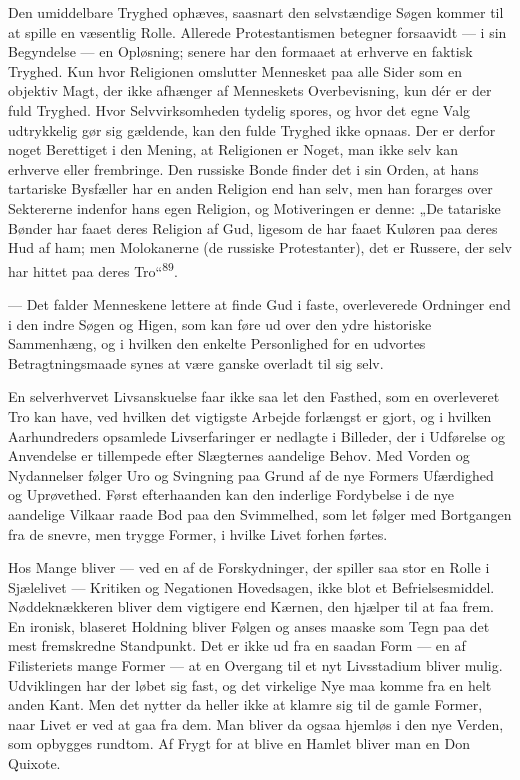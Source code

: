 \documentclass[12pt,a4paper,openany]{book}
\newcommand{\opage}[1]{\marginnote{\footnotesize\textit{[#1]}}}
\begin{document}
Den umiddelbare Tryghed ophæves, saasnart den selvstændige Søgen kommer
til at spille en væsentlig Rolle. Allerede Protestantismen betegner
forsaavidt --- i sin Begyndelse --- en Opløsning; senere har den
formaaet at erhverve en faktisk Tryghed. Kun hvor Religionen omslutter
Mennesket paa alle Sider som en objektiv Magt, der ikke afhænger af
Menneskets Overbevisning, kun dér er der fuld Tryghed. Hvor
Selvvirksomheden tydelig spores, og hvor det egne Valg udtrykkelig gør
sig gældende, kan den fulde Tryghed ikke opnaas. Der er derfor noget
Berettiget i den Mening, at Religionen er Noget, man ikke selv kan
erhverve eller frembringe. Den russiske Bonde finder det i sin Orden, at
hans tartariske Bysfæller har en anden Religion end han selv, men han
forarges over Sektererne indenfor hans egen Religion, og Motiveringen er
denne: „De tatariske Bønder har faaet deres Religion af Gud, ligesom de
har faaet Kuløren paa deres Hud af ham; men Molokanerne (de russiske
Protestanter), det er Russere, der selv har hittet paa deres
Tro“\textsuperscript{89}.

--- Det falder Menneskene lettere at finde Gud i faste, overleverede
Ordninger end i den indre Søgen og Higen, som kan føre ud over den ydre
historiske Sammenhæng, og i hvilken den enkelte Personlighed for en
udvortes Betragtningsmaade synes at være ganske overladt til sig selv.

En selverhvervet Livsanskuelse faar ikke saa let den Fasthed, som en
overleveret Tro kan have, ved hvilken det vigtigste Arbejde forlængst er
gjort, og i hvilken Aarhundreders opsamlede Livserfaringer er nedlagte i
Billeder, der i Udførelse og Anvendelse er tillempede efter Slægternes
aandelige Behov. Med Vorden og Nydannelser følger Uro og Svingning paa
Grund af de nye Formers Ufærdighed og Uprøvethed. Først efterhaanden kan
den inderlige Fordybelse i de nye aandelige Vilkaar raade Bod paa den
Svimmelhed, som let følger med Bortgangen fra de snevre, men trygge
Former, i hvilke Livet forhen førtes.

Hos Mange bliver --- ved en af de Forskydninger, der spiller
\opage{188}saa stor en Rolle i Sjælelivet --- Kritiken og Negationen
Hovedsagen, ikke blot et Befrielsesmiddel. Nøddeknækkeren bliver dem
vigtigere end Kærnen, den hjælper til at faa frem. En ironisk, blaseret
Holdning bliver Følgen og anses maaske som Tegn paa det mest fremskredne
Standpunkt. Det er ikke ud fra en saadan Form --- en af Filisteriets
mange Former --- at en Overgang til et nyt Livsstadium bliver mulig.
Udviklingen har der løbet sig fast, og det virkelige Nye maa komme fra
en helt anden Kant. Men det nytter da heller ikke at klamre sig til de
gamle Former, naar Livet er ved at gaa fra dem. Man bliver da ogsaa
hjemløs i den nye Verden, som opbygges rundtom. Af Frygt for at blive en
Hamlet bliver man en Don Quixote.
\end{document}
